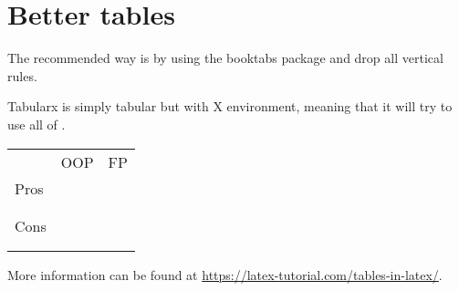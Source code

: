 \section{Better tables}
The recommended way is by using the booktabs package and drop all vertical rules.

Tabularx is simply tabular but with X environment, meaning that it will try to use all of \texttt{\linewidth}.

\begin{center}
  \begin{tabularx}{\linewidth}{l*{2}{X}}
    \toprule
         & OOP & FP \\
    \cmidrule(lr){2-3}
    Pros &     &    \\
         &     &    \\
         &     &    \\
    \midrule
    Cons &     &    \\
         &     &    \\
         &     &    \\
    \bottomrule
  \end{tabularx}
\end{center}

More information can be found at \url{https://latex-tutorial.com/tables-in-latex/}.
